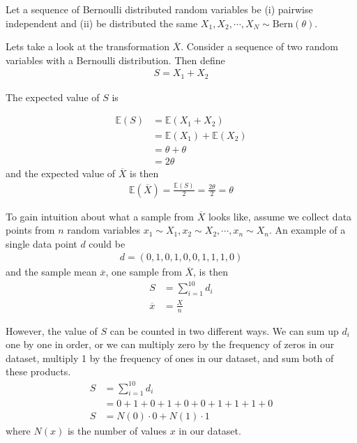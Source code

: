 \begin{VT1}
Let a sequence of Bernoulli distributed random variables be (i) pairwise independent and (ii) be distributed the same $X_{1}, X_{2}, \cdots, X_{N} \sim \text{Bern}(\theta)$.

Lets take a look at the transformation $\overline{X}$.
Consider a sequence of two random variables with a Bernoulli distribution. Then define
\begin{align}
    S = X_{1} + X_{2}
\end{align}

The expected value of $S$ is 

\begin{align}
    \mathbb{E}(S) &= \mathbb{E}(X_{1} + X_{2}) \\
                  &= \mathbb{E}(X_{1}) + \mathbb{E}(X_{2})\\
                  &= \theta + \theta \\ 
                  &= 2\theta
\end{align}
and the expected value of $\overline{X}$ is then 
\begin{align}
    \mathbb{E}(\overline{X}) = \frac{\mathbb{E}(S)}{2}  = \frac{2 \theta}{2} = \theta
\end{align}

To gain intuition about what a sample from $\overline{X}$ looks like, assume we collect data points from $n$ random variables $x_{1} \sim X_{1}, x_{2} \sim X_{2}, \cdots, x_{n} \sim X_{n}$.
An example of a single data point $d$ could be
\begin{align}
    d = (0,1,0,1,0,0,1,1,1,0)
\end{align}
and the sample mean $\overline{x}$, one sample from $\overline{X}$, is then 
\begin{align}
    S &= \sum_{i=1}^{10} d_{i} \\
    \overline{x} &= \frac{X}{n}
\end{align}

However, the value of $S$ can be counted in two different ways. 
We can sum up $d_{i}$ one by one in order, or we can multiply zero by the frequency of zeros in our dataset, multiply 1 by the frequency of ones in our dataset, and sum both of these products.
\begin{align}
    S &= \sum_{i=1}^{10} d_{i} \\
      &= 0+1+0+1+0+0+1+1+1+0\\
    S &= N(0) \cdot 0 + N(1) \cdot 1
\end{align}
where $N(x)$ is the number of values $x$ in our dataset.


\end{VT1}
